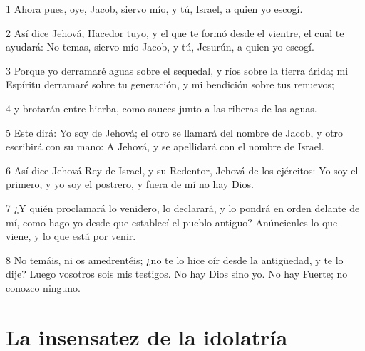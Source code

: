 \par 1 Ahora pues, oye, Jacob, siervo mío, y tú, Israel, a quien yo escogí.
\par 2 Así dice Jehová, Hacedor tuyo, y el que te formó desde el vientre, el cual te ayudará: No temas, siervo mío Jacob, y tú, Jesurún, a quien yo escogí.
\par 3 Porque yo derramaré aguas sobre el sequedal, y ríos sobre la tierra árida; mi Espíritu derramaré sobre tu generación, y mi bendición sobre tus renuevos;
\par 4 y brotarán entre hierba, como sauces junto a las riberas de las aguas.
\par 5 Este dirá: Yo soy de Jehová; el otro se llamará del nombre de Jacob, y otro escribirá con su mano: A Jehová, y se apellidará con el nombre de Israel.
\par 6 Así dice Jehová Rey de Israel, y su Redentor, Jehová de los ejércitos: Yo soy el primero, y yo soy el postrero, y fuera de mí no hay Dios.
\par 7 ¿Y quién proclamará lo venidero, lo declarará, y lo pondrá en orden delante de mí, como hago yo desde que establecí el pueblo antiguo? Anúncienles lo que viene, y lo que está por venir.
\par 8 No temáis, ni os amedrentéis; ¿no te lo hice oír desde la antigüedad, y te lo dije? Luego vosotros sois mis testigos. No hay Dios sino yo. No hay Fuerte; no conozco ninguno.

\section*{La insensatez de la idolatría}

